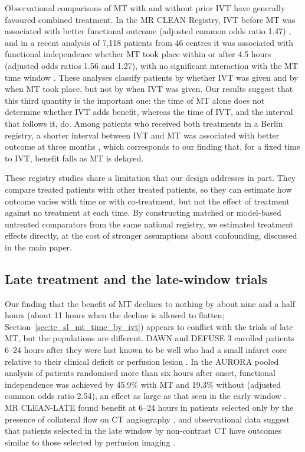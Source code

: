 Observational comparisons of MT with and without prior IVT have generally favoured combined treatment. In the MR CLEAN Registry, IVT before MT was associated with better functional outcome (adjusted common odds ratio 1.47) , and in a recent analysis of 7,118 patients from 46 centres it was associated with functional independence whether MT took place within or after 4.5 hours (adjusted odds ratios 1.56 and 1.27), with no significant interaction with the MT time window . These analyses classify patients by whether IVT was given and by when MT took place, but not by when IVT was given. Our results suggest that this third quantity is the important one: the time of MT alone does not determine whether IVT adds benefit, whereas the time of IVT, and the interval that follows it, do. Among patients who received both treatments in a Berlin registry, a shorter interval between IVT and MT was associated with better outcome at three months , which corresponds to our finding that, for a fixed time to IVT, benefit falls as MT is delayed.

These registry studies share a limitation that our design addresses in part. They compare treated patients with other treated patients, so they can estimate how outcome varies with time or with co-treatment, but not the effect of treatment against no treatment at each time. By constructing matched or model-based untreated comparators from the same national registry, we estimated treatment effects directly, at the cost of stronger assumptions about confounding, discussed in the main paper.

\subsection{Late treatment and the late-window trials}

Our finding that the benefit of MT declines to nothing by about nine and a half hours (about 11 hours when the decline is allowed to flatten; Section~\ref{sec:te_sl_mt_time_by_ivt}) appears to conflict with the trials of late MT, but the populations are different. DAWN and DEFUSE 3 enrolled patients 6--24 hours after they were last known to be well who had a small infarct core relative to their clinical deficit or perfusion lesion . In the AURORA pooled analysis of patients randomised more than six hours after onset, functional independence was achieved by 45.9\% with MT and 19.3\% without (adjusted common odds ratio 2.54), an effect as large as that seen in the early window . MR CLEAN-LATE found benefit at 6--24 hours in patients selected only by the presence of collateral flow on CT angiography , and observational data suggest that patients selected in the late window by non-contrast CT have outcomes similar to those selected by perfusion imaging .

